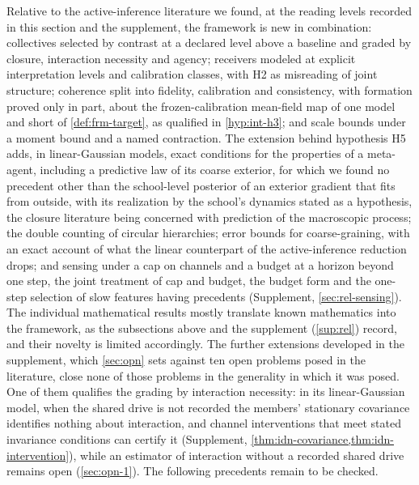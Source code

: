 Relative to the active-inference literature we found, at the reading levels recorded in this section and the supplement, the framework is new in combination: collectives selected by contrast at a declared level above a baseline and graded by closure, interaction necessity and agency; receivers modeled at explicit interpretation levels and calibration classes, with H2 as misreading of joint structure; coherence split into fidelity, calibration and consistency, with formation proved only in part, about the frozen-calibration mean-field map of one model and short of \cref{def:frm-target}, as qualified in \cref{hyp:int-h3}; and scale bounds under a moment bound and a named contraction. The extension behind hypothesis H5 adds, in linear-Gaussian models, exact conditions for the properties of a meta-agent, including a predictive law of its coarse exterior, for which we found no precedent other than the school-level posterior of an exterior gradient that \citet{heins2026collective} fits from outside, with its realization by the school's dynamics stated as a hypothesis, the closure literature being concerned with prediction of the macroscopic process; the double counting of circular hierarchies; error bounds for coarse-graining, with an exact account of what the linear counterpart of the active-inference reduction drops; and sensing under a cap on channels and a budget at a horizon beyond one step, the joint treatment of cap and budget, the budget form and the one-step selection of slow features having precedents (Supplement, \cref{sec:rel-sensing}). The individual mathematical results mostly translate known mathematics into the framework, as the subsections above and the supplement (\cref{sup:rel}) record, and their novelty is limited accordingly. The further extensions developed in the supplement, which \cref{sec:opn} sets against ten open problems posed in the literature, close none of those problems in the generality in which it was posed. One of them qualifies the grading by interaction necessity: in its linear-Gaussian model, when the shared drive is not recorded the members' stationary covariance identifies nothing about interaction, and channel interventions that meet stated invariance conditions can certify it (Supplement, \cref{thm:idn-covariance,thm:idn-intervention}), while an estimator of interaction without a recorded shared drive remains open (\cref{sec:opn-1}). The following precedents remain to be checked.
